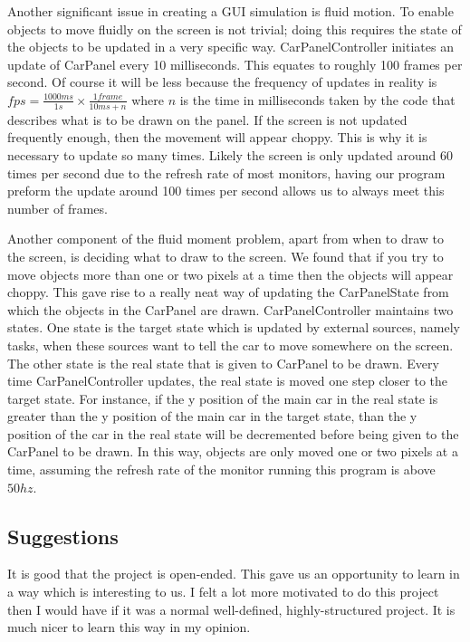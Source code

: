 \documentclass{article} %
\begin{document}
Another significant issue in creating a GUI simulation is fluid motion.
To enable objects to move fluidly on the screen is not trivial; doing this requires the state of the objects to be updated in a very specific way.
CarPanelController initiates an update of CarPanel every 10 milliseconds. This equates to roughly 100 frames per second. Of course it will be less because the frequency of updates in reality is $fps = \frac{1000 ms}{1 s} \times \frac{1 frame}{10ms + n}$ where $n$ is the time in milliseconds taken by the code that describes what is to be drawn on the panel.
If the screen is not updated frequently enough, then the movement will appear choppy.
This is why it is necessary to update so many times. Likely the screen is only updated around 60 times per second due to the refresh rate of most monitors, having our program preform the update around 100 times per second allows us to always meet this number of frames.

Another component of the fluid moment problem, apart from when to draw to the screen, is deciding what to draw to the screen.
We found that if you try to move objects more than one or two pixels at a time then the objects will appear choppy.
This gave rise to a really neat way of updating the CarPanelState from which the objects in the CarPanel are drawn.
CarPanelController maintains two states. 
One state is the target state which is updated by external sources, namely tasks, when these sources want to tell the car to move somewhere on the screen.
The other state is the real state that is given to CarPanel to be drawn.
Every time CarPanelController updates, the real state is moved one step closer to the target state.
For instance, 
if the y position of the main car in the real state is greater than the y position of the main car in the target state, 
than the y position of the car in the real state will be decremented before being given to the CarPanel to be drawn.
In this way, objects are only moved one or two pixels at a time, assuming the refresh rate of the monitor running this program is above $50hz$.

\subsection{Suggestions}
It is good that the project is open-ended.
This gave us an opportunity to learn in a way which is interesting to us.
I felt a lot more motivated to do this project then I would have if it was a normal well-defined, highly-structured project.
It is much nicer to learn this way in my opinion.
\end{document}
